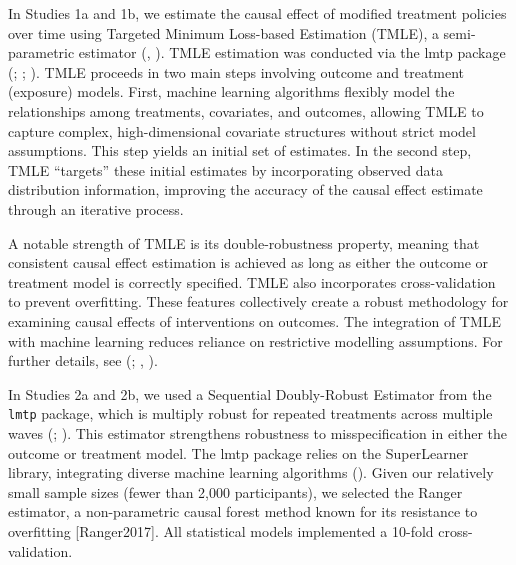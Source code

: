 \documentclass[
  single column]{article}
\begin{document}
In Studies 1a and 1b, we estimate the causal effect of modified
treatment policies over time using Targeted Minimum Loss-based
Estimation (TMLE), a semi-parametric estimator
(,
). TMLE estimation was conducted via
the lmtp package (;
;
). TMLE proceeds in
two main steps involving outcome and treatment (exposure) models. First,
machine learning algorithms flexibly model the relationships among
treatments, covariates, and outcomes, allowing TMLE to capture complex,
high-dimensional covariate structures without strict model assumptions.
This step yields an initial set of estimates. In the second step, TMLE
``targets'' these initial estimates by incorporating observed data
distribution information, improving the accuracy of the causal effect
estimate through an iterative process.

A notable strength of TMLE is its double-robustness property, meaning
that consistent causal effect estimation is achieved as long as either
the outcome or treatment model is correctly specified. TMLE also
incorporates cross-validation to prevent overfitting. These features
collectively create a robust methodology for examining causal effects of
interventions on outcomes. The integration of TMLE with machine learning
reduces reliance on restrictive modelling assumptions. For further
details, see (;
,
).

In Studies 2a and 2b, we used a Sequential Doubly-Robust Estimator from
the \texttt{lmtp} package, which is multiply robust for repeated
treatments across multiple waves (; ). This estimator strengthens robustness to misspecification in
either the outcome or treatment model. The lmtp package relies on the
SuperLearner library, integrating diverse machine learning algorithms
(). Given our
relatively small sample sizes (fewer than 2,000 participants), we
selected the Ranger estimator, a non-parametric causal forest method
known for its resistance to overfitting {[}Ranger2017{]}. All
statistical models implemented a 10-fold cross-validation.
\end{document}
